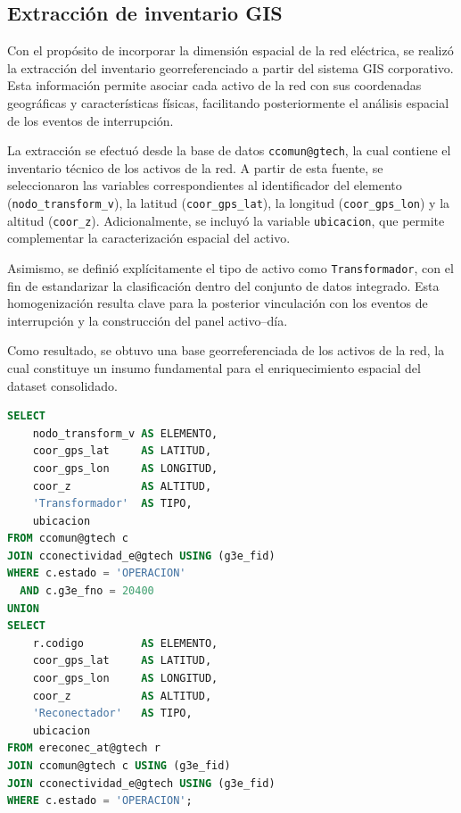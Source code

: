 \subsection{Extracción de inventario GIS}

Con el propósito de incorporar la dimensión espacial de la red eléctrica, se realizó la extracción del inventario georreferenciado a partir del sistema GIS corporativo. Esta información permite asociar cada activo de la red con sus coordenadas geográficas y características físicas, facilitando posteriormente el análisis espacial de los eventos de interrupción.

La extracción se efectuó desde la base de datos \texttt{ccomun@gtech}, la cual contiene el inventario técnico de los activos de la red. A partir de esta fuente, se seleccionaron las variables correspondientes al identificador del elemento (\texttt{nodo\_transform\_v}), la latitud (\texttt{coor\_gps\_lat}), la longitud (\texttt{coor\_gps\_lon}) y la altitud (\texttt{coor\_z}). Adicionalmente, se incluyó la variable \texttt{ubicacion}, que permite complementar la caracterización espacial del activo.

Asimismo, se definió explícitamente el tipo de activo como \texttt{Transformador}, con el fin de estandarizar la clasificación dentro del conjunto de datos integrado. Esta homogenización resulta clave para la posterior vinculación con los eventos de interrupción y la construcción del panel activo–día.

Como resultado, se obtuvo una base georreferenciada de los activos de la red, la cual constituye un insumo fundamental para el enriquecimiento espacial del dataset consolidado.

\begin{lstlisting}[style=thesiscode,language=SQL]
SELECT 
    nodo_transform_v AS ELEMENTO,
    coor_gps_lat     AS LATITUD,
    coor_gps_lon     AS LONGITUD,
    coor_z           AS ALTITUD,
    'Transformador'  AS TIPO,
    ubicacion
FROM ccomun@gtech c
JOIN cconectividad_e@gtech USING (g3e_fid)
WHERE c.estado = 'OPERACION'
  AND c.g3e_fno = 20400
UNION
SELECT 
    r.codigo         AS ELEMENTO,
    coor_gps_lat     AS LATITUD,
    coor_gps_lon     AS LONGITUD,
    coor_z           AS ALTITUD,
    'Reconectador'   AS TIPO,
    ubicacion
FROM ereconec_at@gtech r
JOIN ccomun@gtech c USING (g3e_fid)
JOIN cconectividad_e@gtech USING (g3e_fid)
WHERE c.estado = 'OPERACION';

\end{lstlisting}

